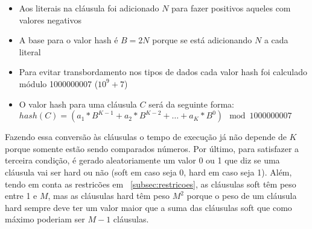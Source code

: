 	\begin{itemize}
		\item Aos literais na cláusula foi adicionado $N$ para fazer positivos aqueles com valores negativos
		\item A base para o valor hash é $B = 2N$ porque se está adicionando $N$ a cada literal
		\item Para evitar transbordamento nos tipos de dados cada valor hash foi calculado módulo 1000000007 ($10^9 + 7$)
		\item O valor hash para uma cláusula $C$ será da seguinte forma: ${hash}( C ) = ( a_1 * B^{K-1} + a_2 * B^{K-2} + \ldots + a_K * B^0 ) \mod 1000000007$
	\end{itemize}
	Fazendo essa conversão às cláusulas o tempo de execução já não depende de $K$ porque somente estão sendo comparados números. Por último, para satisfazer a terceira condição, é gerado aleatoriamente um valor 0 ou 1 que diz se uma cláusula vai ser hard ou não (soft em caso seja 0, hard em caso seja 1). Além, tendo em conta as restricões em ~\ref{subsec:restricoes}, as cláusulas soft têm peso entre 1 e $M$, mas as cláusulas hard têm peso $M^2$ porque o peso de um cláusula hard sempre deve ter um valor maior que a suma das cláusulas soft que como máximo poderiam ser $M - 1$ cláusulas.